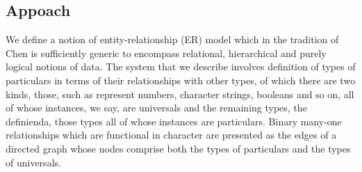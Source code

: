  \subsection{Appoach}

We  define a notion of entity-relationship (ER) model which in the tradition of Chen\cite{Chen1976} is sufficiently generic to encompass relational, hierarchical and purely logical  notions of data.
The system that we describe involves definition of types of particulars in terms of their relationships with other types, of which there are two kinds, those, such as represent numbers, character strings, booleans and so on, all of whose instances, we say, are universals and the remaining types, the definienda, those types all of whose instances are particulars. Binary many-one relationships which are functional in character are presented as the edges of a directed graph whose nodes comprise both the types of particulars and the types of universals. 
